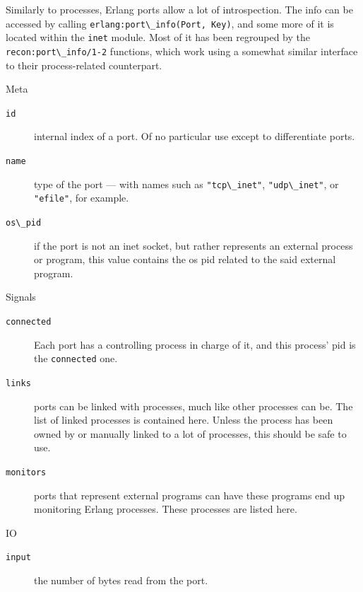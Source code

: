 \documentclass[11pt, oneside]{book}   	%
\newcommand{\module}[1]{\Verb`#1`}
\newcommand{\function}[1]{\Verb`#1`}
\newcommand{\expression}[1]{\Verb`#1`}
\begin{document}
Similarly to processes, Erlang ports allow a lot of introspection. The info can be accessed by calling \function{erlang:port\_info(Port, Key)}, and some more of it is located within the \module{inet} module. Most of it has been regrouped by the \function{recon:port\_info/1-2} functions, which work using a somewhat similar interface to their process-related counterpart. 

\begin{description*}
	\item[Meta] \hfill
		\begin{description}		
			\item[\expression{id}] internal index of a port. Of no particular use except to differentiate ports.
			
			\item[\expression{name}] type of the port — with names such as \expression{"tcp\_inet"}, \expression{"udp\_inet"}, or \expression{"efile"}, for example.
			
			\item[\expression{os\_pid}] if the port is not an inet socket, but rather represents an external process or program, this value contains the os pid related to the said external program.
		\end{description}

	\item[Signals] \hfill
		\begin{description}		
			\item[\expression{connected}] Each port has a controlling process in charge of it, and this process' pid is the \expression{connected} one.
			
			\item[\expression{links}] ports can be linked with processes, much like other processes can be. The list of linked processes is contained here. Unless the process has been owned by or manually linked to a lot of processes, this should be safe to use.
			
			\item[\expression{monitors}] ports that represent external programs can have these programs end up monitoring Erlang processes. These processes are listed here.
		\end{description}
		
	\item[IO] \hfill
		\begin{description}		
			\item[\expression{input}] the number of bytes read from the port.
			

\end{description}
\end{description*}
\end{document}
